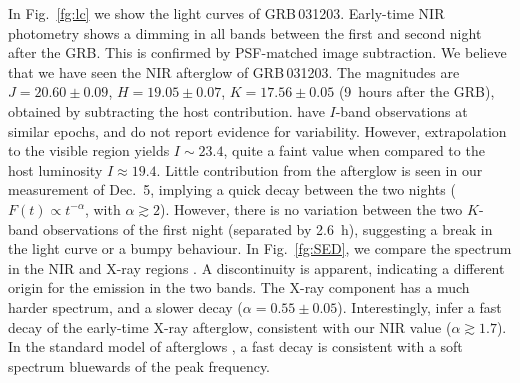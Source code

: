 \documentclass{emulateapj}
\begin{document}
In Fig.~\ref{fg:lc} we show the light curves of GRB\,031203. Early-time
NIR photometry shows a dimming in all bands between the first and second
night after the GRB. This is confirmed by PSF-matched image
subtraction. We believe that we have seen the NIR afterglow of
GRB\,031203. The magnitudes are $J = 20.60 \pm 0.09$, $H = 19.05 \pm
0.07$, $K = 17.56 \pm 0.05$ (9~hours after the GRB), obtained by
subtracting the host contribution. \citet{Co04} have $I$-band
observations at similar epochs, and do not report evidence for
variability. However, extrapolation to the visible region yields $I \sim
23.4$, quite a faint value when compared to the host luminosity $I
\approx 19.4$. Little contribution from the afterglow is seen in our
measurement of Dec.~5, implying a quick decay between the two nights
($F(t) \propto t^{-\alpha}$, with $\alpha \gtrsim 2$).  However, there
is no variation between the two $K$-band observations of the first night
(separated by 2.6~h), suggesting a break in the light curve or a bumpy
behaviour. In Fig.~\ref{fg:SED}, we compare the spectrum in the NIR and
X-ray regions \citep{Wa04}. A discontinuity is apparent, indicating a
different origin for the emission in the two bands. The X-ray component
has a much harder spectrum, and a slower decay ($\alpha = 0.55 \pm
0.05$). Interestingly, \citet{Wa04} infer a fast decay of the early-time
X-ray afterglow, consistent with our NIR value ($\alpha \gtrsim
1.7$). In the standard model of afterglows \citep[e.g.][]{SPN98}, a fast
decay is consistent with a soft spectrum bluewards of the peak
frequency.
\end{document}
